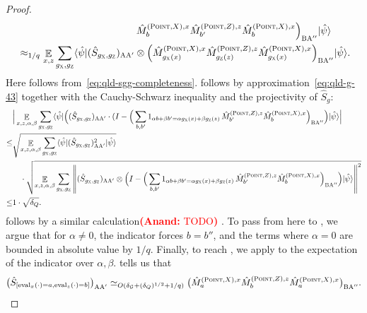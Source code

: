 \documentclass[11pt]{article}
\theoremstyle{definition}
\newcommand{\ket}[1]{|#1\rangle}
\newcommand{\bra}[1]{\langle#1|}
\newcommand{\ot}{\otimes}
\newcommand{\mG}{\ensuremath{\mathcal{G}}}
\newcommand{\norm}[1]{\left\| {#1} \right\|}
\newcommand{\E}{\mathop{\mathbb{E}}\displaylimits}
\newcommand{\labelstyle}[1]{\ensuremath{\textsc{#1}}\xspace}
\newcommand{\xpt}{\labelstyle{X}}
\newcommand{\zpt}{\labelstyle{Z}}
\newcommand{\alice}{\labelstyle{A}}
\newcommand{\bob}{\labelstyle{B}}
\newcommand{\typestyle}[1]{\ensuremath{\textsc{#1}}\xspace}
\newcommand{\Point}{\typestyle{Point}}
\newcommand{\eval}{\mathrm{eval}}
\newcommand{\anote}[1]{\textcolor{red}{\small {\textbf{(Anand:} #1\textbf{) }}}}
\newcommand{\anote}[1]{}
\begin{document}
\begin{proof}
\begin{align}
    &\hspace{12em}\hat{M}^{(\Point, X), x}_{b} \hat{M}^{(\Point,Z),z}_{b'} \hat{M}^{(\Point,X),x}_{b} \Big)_{\bob \alice''} \ket{\hat{\psi}} \label{eq:qld-s-mmm-positive} \\
		&\approx_{ 1/q}\E_{x,z}  \sum_{g_\xpt, g_\zpt} \bra{\hat{\psi}} (\hat{S}_{g_\xpt,g_\zpt})_{\alice \alice'} \otimes \Big ( \hat{M}^{(\Point, X), x}_{g_\xpt(x)} \hat{M}^{(\Point,Z),z}_{g_\zpt(z)} \hat{M}^{(\Point,X),x}_{g_\xpt(x)} \Big)_{\bob \alice''} \ket{\hat{\psi}}. \label{eq:qld-xzx-disagree}
	\end{align}
	Here  follows from~\eqref{eq:qld-sgg-completeness}.  follows by approximation~\eqref{eq:qld-g-43} together with the Cauchy-Schwarz inequality and the projectivity of $\hat{S}_g$:
        \begin{align*}
          &\Big| \E_{x,z,\alpha,\beta} \sum_{g_\xpt, g_\zpt} \bra{\hat{\psi}} \Big( (\hat{S}_{g_\xpt, g_\zpt})_{\alice \alice'} \cdot (I -  \Big( \sum_{b,b'} 1_{\alpha b + \beta b' = \alpha g_\xpt (x) + \beta g_\zpt(z)} \, \hat{M}^{(\Point,Z),z}_{b'} \hat{M}^{(\Point,X),x}_{b} \Big)_{\bob \alice''}\Big) \ket{\hat{\psi}} \Big| \\
          \leq& \sqrt{\E_{x,z,\alpha,\beta} \sum_{g_\xpt, g_\zpt} \bra{\hat{\psi}} (\hat{S}_{g_\xpt, g_\zpt})_{\alice \alice'}^2 \ket{\hat{\psi}}} \\
          &\quad \cdot \sqrt{\E_{x,z,\alpha,\beta} \sum_{g_\xpt, g_\zpt} \norm{ (\hat{S}_{g_\xpt, g_\zpt})_{\alice \alice'} \ot 
\Big(I - \Big( \sum_{b,b'} 1_{\alpha b + \beta b' = \alpha g_\xpt(x) + \beta g_\zpt(z)} \, \hat{M}^{(\Point, Z),z}_{b'} \hat{M}^{(\Point, X), x}_{b} \Big)_{\bob \alice''} \Big)\ket{\hat{\psi}} }^2 } \\
          \leq& 1 \cdot \sqrt{\delta_Q}.
        \end{align*}
         follows by a similar calculation\anote{TODO}. To pass from here to , we argue that for $\alpha \neq 0$, the indicator forces $b = b''$, and the terms where $\alpha = 0$ are bounded in absolute value by $1/q$. Finally, to reach , we apply  to the expectation of the indicator over $\alpha, \beta$.  tells us that
        \begin{equation} \big(\hat{S}_{[\eval_{x}(\cdot) = a, \eval_{z}(\cdot) = b]}\big)_{\alice \alice'} \simeq_{O(\delta_{\mG} + (\delta_Q)^{1/2} + 1/q)} \big( \hat{M}^{(\Point, X), x}_{a} \hat{M}^{(\Point, Z), z}_{b} \hat{M}^{(\Point, X), x}_{a}\big)_{\bob \alice''}. \label{eq:qld-sgg-mhat-sandwich} \end{equation}


\end{proof}
\end{document}
